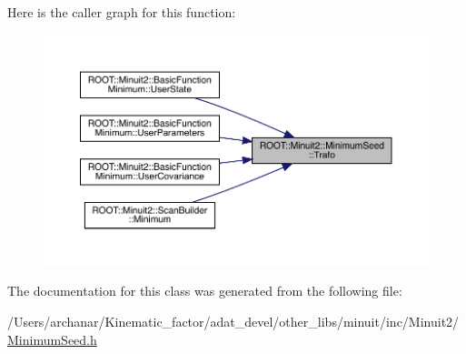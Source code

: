 Here is the caller graph for this function\+:\nopagebreak
\begin{figure}[H]
\begin{center}
\leavevmode
\includegraphics[width=350pt]{d1/d50/classROOT_1_1Minuit2_1_1MinimumSeed_a140162d25593e6675f6f521fc9d5fc84_icgraph}
\end{center}
\end{figure}


The documentation for this class was generated from the following file\+:\begin{DoxyCompactItemize}
\item 
/\+Users/archanar/\+Kinematic\+\_\+factor/adat\+\_\+devel/other\+\_\+libs/minuit/inc/\+Minuit2/\mbox{\hyperlink{other__libs_2minuit_2inc_2Minuit2_2MinimumSeed_8h}{Minimum\+Seed.\+h}}\end{DoxyCompactItemize}
